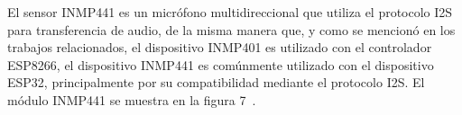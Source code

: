 El sensor INMP441 es un micrófono multidireccional que utiliza el protocolo I2S~\cite{keysight_i2s_blog} para transferencia de audio, de la misma manera que, y como se mencionó en los trabajos relacionados, el dispositivo INMP401 es utilizado con el controlador ESP8266, el dispositivo INMP441 es comúnmente utilizado con el dispositivo ESP32, principalmente por su compatibilidad mediante el protocolo I2S. El módulo INMP441 se muestra en la figura  7~\cite{inmp441_datasheet}.
